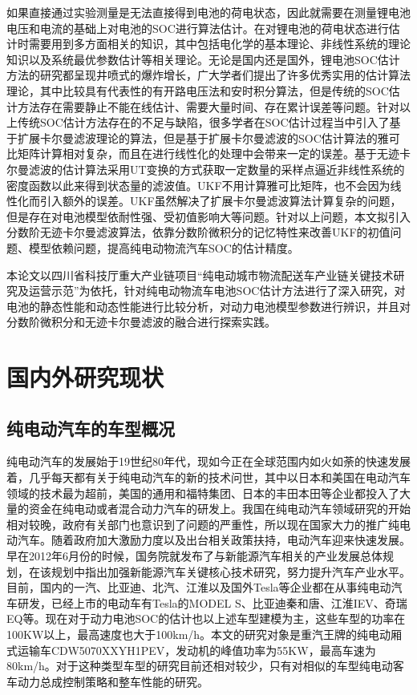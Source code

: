 如果直接通过实验测量是无法直接得到电池的荷电状态，因此就需要在测量锂电池电压和电流的基础上对电池的SOC进行算法估计。在对锂电池的荷电状态进行估计时需要用到多方面相关的知识，其中包括电化学的基本理论、非线性系统的理论知识以及系统最优参数估计等相关理论。无论是国内还是国外，锂电池SOC估计方法的研究都呈现井喷式的爆炸增长，广大学者们提出了许多优秀实用的估计算法理论，其中比较具有代表性的有开路电压法和安时积分算法，但是传统的SOC估计方法存在需要静止不能在线估计、需要大量时间、存在累计误差等问题。针对以上传统SOC估计方法存在的不足与缺陷，很多学者在SOC估计过程当中引入了基于扩展卡尔曼滤波理论的算法，但是基于扩展卡尔曼滤波的SOC估计算法的雅可比矩阵计算相对复杂，而且在进行线性化的处理中会带来一定的误差。基于无迹卡尔曼滤波的估计算法采用UT变换的方式获取一定数量的采样点逼近非线性系统的密度函数以此来得到状态量的滤波值。UKF不用计算雅可比矩阵，也不会因为线性化而引入额外的误差。UKF虽然解决了扩展卡尔曼滤波算法计算复杂的问题，但是存在对电池模型依耐性强、受初值影响大等问题。针对以上问题，本文拟引入分数阶无迹卡尔曼滤波算法，依靠分数阶微积分的记忆特性来改善UKF的初值问题、模型依赖问题，提高纯电动物流汽车SOC的估计精度。

本论文以四川省科技厅重大产业链项目“纯电动城市物流配送车产业链关键技术研究及运营示范”为依托，针对纯电动物流车电池SOC估计方法进行了深入研究，对电池的静态性能和动态性能进行比较分析，对动力电池模型参数进行辨识，并且对分数阶微积分和无迹卡尔曼滤波的融合进行探索实践。
\section{国内外研究现状}
	\subsection{纯电动汽车的车型概况}
	纯电动汽车的发展始于19世纪80年代，现如今正在全球范围内如火如荼的快速发展着，几乎每天都有关于纯电动汽车的新的技术问世，其中以日本和美国在电动汽车领域的技术最为超前，美国的通用和福特集团、日本的丰田本田等企业都投入了大量的资金在纯电动或者混合动力汽车的研发上。我国在纯电动汽车领域研究的开始相对较晚，政府有关部门也意识到了问题的严重性，所以现在国家大力的推广纯电动汽车。随着政府加大激励力度以及出台相关政策扶持，电动汽车迎来快速发展。早在2012年6月份的时候，国务院就发布了与新能源汽车相关的产业发展总体规划，在该规划中指出加强新能源汽车关键核心技术研究，努力提升汽车产业水平。目前，国内的一汽、比亚迪、北汽、江淮以及国外Tesla等企业都在从事纯电动汽车研发，已经上市的电动车有Tesla的MODEL S、比亚迪秦和唐、江淮IEV、奇瑞EQ等。现在对于动力电池SOC的估计也以上述车型建模为主，这些车型的功率在100KW以上，最高速度也大于100km/h。本文的研究对象是重汽王牌的纯电动厢式运输车CDW5070XXYH1PEV，发动机的峰值功率为55KW，最高车速为80km/h。对于这种类型车型的研究目前还相对较少，只有对相似的车型纯电动客车动力总成控制策略和整车性能的研究。
